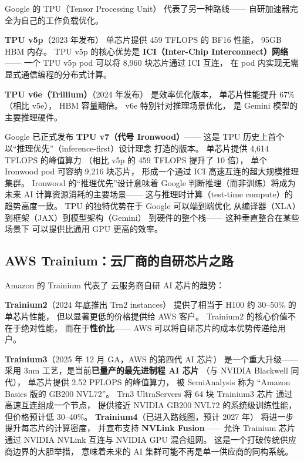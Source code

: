Google 的 TPU（Tensor Processing Unit）
代表了另一种路线——
自研加速器完全为自己的工作负载优化。

\textbf{TPU v5p}（2023 年发布）
单芯片提供 459 TFLOPS 的 BF16 性能，
95GB HBM 内存。
TPU v5p 的核心优势是
\textbf{ICI（Inter-Chip Interconnect）网络}——
一个 TPU v5p pod 可以将 8,960 块芯片通过 ICI 互连，
在 pod 内实现无需显式通信编程的分布式计算。

\textbf{TPU v6e（Trillium）}（2024 年发布）
是效率优化版本，
单芯片性能提升 67\%（相比 v5e），
HBM 容量翻倍。
v6e 特别针对推理场景优化，
是 Gemini 模型的主要推理硬件。

Google 已正式发布 \textbf{TPU v7（代号 Ironwood）}——
这是 TPU 历史上首个以``推理优先''（inference-first）设计理念
打造的版本。
单芯片提供 4,614 TFLOPS 的峰值算力
（相比 v5p 的 459 TFLOPS 提升了 10 倍），
单个 Ironwood pod 可容纳 9,216 块芯片，
形成一个通过 ICI 高速互连的超大规模推理集群。
Ironwood 的``推理优先''设计意味着
Google 判断推理（而非训练）将成为
未来 AI 计算资源消耗的主要场景——
这与推理时计算（test-time compute）的趋势高度一致。
TPU 的独特优势在于
Google 可以端到端优化
从编译器（XLA）到框架（JAX）到模型架构（Gemini）
到硬件的整个栈——
这种垂直整合在某些场景下
可以提供比通用 GPU 更高的效率。

\subsection{AWS Trainium：云厂商的自研芯片之路}

Amazon 的 Trainium 代表了
云服务商自研 AI 芯片的趋势：

\textbf{Trainium2}（2024 年底推出 Trn2 instances）
提供了相当于 H100 约 30--50\% 的单芯片性能，
但以显著更低的价格提供给 AWS 客户。
Trainium2 的核心价值不在于绝对性能，
而在于\textbf{性价比}——
AWS 可以将自研芯片的成本优势传递给用户。

\textbf{Trainium3}（2025 年 12 月 GA，AWS 的第四代 AI 芯片）
是一个重大升级——
采用 3nm 工艺，是当前\textbf{已量产的最先进制程 AI 芯片}
（与 NVIDIA Blackwell 同代），
单芯片提供 2.52 PFLOPS 的峰值算力，
被 SemiAnalysis 称为
``Amazon Basics 版的 GB200 NVL72''。
Trn3 UltraServers 将 64 块 Trainium3 芯片
通过高速互连组成一个节点，
提供接近 NVIDIA GB200 NVL72 的系统级训练性能，
但价格预计低 30--40\%。
\textbf{Trainium4}（已进入路线图，预计 2027 年）
将进一步提升每芯片的计算密度，
并宣布支持 \textbf{NVLink Fusion}——
允许 Trainium 芯片通过 NVIDIA NVLink 互连与 NVIDIA GPU 混合组网。
这是一个打破传统供应商边界的大胆举措，
意味着未来的 AI 集群可能不再是单一供应商的同构系统。

